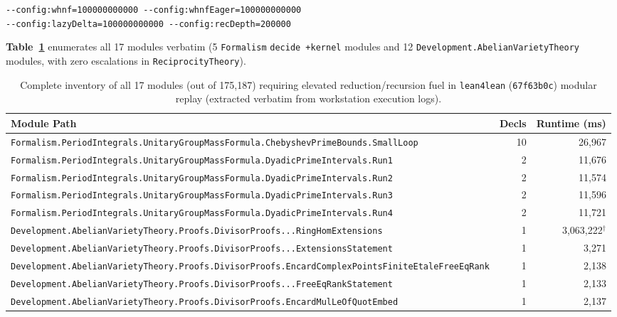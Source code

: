 \documentclass[11pt,a4paper]{article}
\begin{document}
\begin{enumerate}
  \begin{center}
    \texttt{-{}-config:whnf=100000000000 -{}-config:whnfEager=100000000000}\\
    \texttt{-{}-config:lazyDelta=100000000000 -{}-config:recDepth=200000}
  \end{center}
  \textbf{Table~\ref{tab:elevated_fuel}} enumerates all 17 modules verbatim (5 \texttt{Formalism} \texttt{decide +kernel} modules and 12 \texttt{Development.AbelianVarietyTheory} modules, with zero escalations in \texttt{ReciprocityTheory}).
\end{enumerate}

\begin{table}[!htb]
\centering
\caption{Complete inventory of all 17 modules (out of 175,187) requiring elevated reduction/recursion fuel in \texttt{lean4lean} (\texttt{67f63b0c}) modular replay (extracted verbatim from workstation execution logs).}
\label{tab:elevated_fuel}
{\fontsize{6.9}{8.2}\selectfont
\setlength{\tabcolsep}{3pt}
\begin{tabular}{@{}lrr@{}}
\toprule
\textbf{Module Path} & \textbf{Decls} & \textbf{Runtime (ms)} \\
\midrule
\texttt{Formalism.PeriodIntegrals.UnitaryGroupMassFormula.ChebyshevPrimeBounds.SmallLoop} & 10 & 26,967 \\
\texttt{Formalism.PeriodIntegrals.UnitaryGroupMassFormula.DyadicPrimeIntervals.Run1} & 2 & 11,676 \\
\texttt{Formalism.PeriodIntegrals.UnitaryGroupMassFormula.DyadicPrimeIntervals.Run2} & 2 & 11,574 \\
\texttt{Formalism.PeriodIntegrals.UnitaryGroupMassFormula.DyadicPrimeIntervals.Run3} & 2 & 11,596 \\
\texttt{Formalism.PeriodIntegrals.UnitaryGroupMassFormula.DyadicPrimeIntervals.Run4} & 2 & 11,721 \\
\texttt{Development.AbelianVarietyTheory.Proofs.DivisorProofs...RingHomExtensions} & 1 & 3,063,222$^\dagger$ \\
\texttt{Development.AbelianVarietyTheory.Proofs.DivisorProofs...ExtensionsStatement} & 1 & 3,271 \\
\texttt{Development.AbelianVarietyTheory.Proofs.DivisorProofs.EncardComplexPointsFiniteEtaleFreeEqRank} & 1 & 2,138 \\
\texttt{Development.AbelianVarietyTheory.Proofs.DivisorProofs...FreeEqRankStatement} & 1 & 2,133 \\
\texttt{Development.AbelianVarietyTheory.Proofs.DivisorProofs.EncardMulLeOfQuotEmbed} & 1 & 2,137 \\

\end{tabular}}
\end{table}
\end{document}

